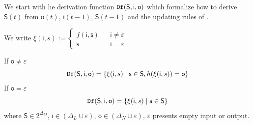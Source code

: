 We start with he derivation function $\Ded( \mathsf{S},  \mathsf{i},  \mathsf{o})$ which formalize how to derive $\mathsf{S}(t)$ from $\mathsf{o}(t)$, $\mathsf{i}(t-1)$, $\mathsf{S}(t-1)$ and the updating rules of \BCN.  %

We write $\xi(\mathsf{i}, s):= \left\{
\begin{array}{rcl}
f( \mathsf{i}, \mathsf{s})      &      & {\mathsf{i}\neq \varepsilon}\\
\mathsf{s}       &      & {\mathsf{i}= \varepsilon}
\end{array} \right. $

\begin{definition}[$\Ded( \mathsf{S},  \mathsf{i},  \mathsf{o})$] 
If $\mathsf{o}\neq \varepsilon$
\begin{equation*}
 {\tt Df}( \mathsf{S},  \mathsf{i},  \mathsf{o})=\{  \xi(\mathsf{i}, s ) \mid  \mathsf{s} \in \mathsf{S},  h(\xi(\mathsf{i}, s ))=\mathsf{o}\}
\end{equation*}
If $\mathsf{o}= \varepsilon$
\begin{equation*}
{\tt Df}( \mathsf{S},  \mathsf{i},  \mathsf{o})=\{  \xi(\mathsf{i}, s ) \mid  \mathsf{s} \in \mathsf{S}\}
\end{equation*}
where $\mathsf{S}\in 2^{\Delta_M}$, $\mathsf{i} \in (\Delta_L\cup\varepsilon)$, $\mathsf{o} \in (\Delta_N\cup\varepsilon)$, $\varepsilon$ presents empty input or output.
\end{definition}

